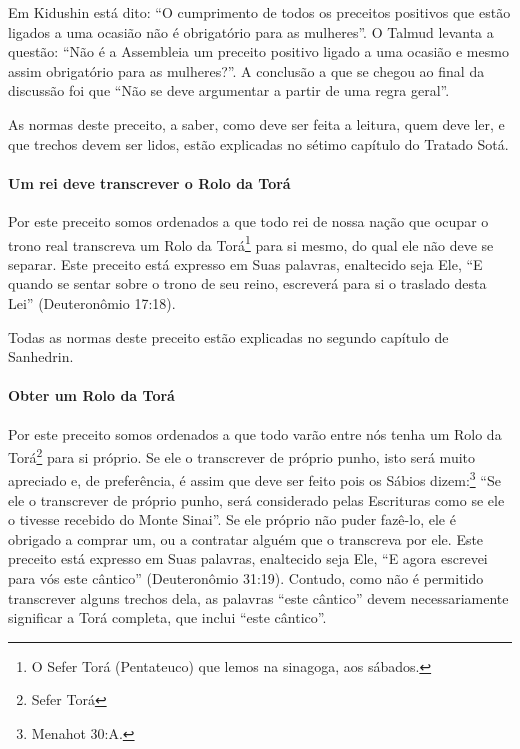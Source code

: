 Em Kidushin está dito: ``O cumprimento de todos os preceitos positivos
que estão ligados a uma ocasião não é obrigatório para as mulheres''. O
Talmud levanta a questão: ``Não é a Assembleia um preceito positivo
ligado a uma ocasião e mesmo assim obrigatório para as mulheres?''. A
conclusão a que se chegou ao final da discussão foi que ``Não se deve
argumentar a partir de uma regra geral''.

As normas deste preceito, a saber, como deve ser feita a leitura, quem
deve ler, e que trechos devem ser lidos, estão explicadas no sétimo
capítulo do Tratado Sotá.

\paragraph{Um rei deve transcrever o Rolo da Torá}

Por este preceito somos ordenados a que todo rei de nossa nação que
ocupar o trono real transcreva um Rolo da Torá\footnote{O Sefer Torá (Pentateuco) que lemos na sinagoga, aos sábados.}
para si mesmo, do qual ele não deve se separar. Este preceito está
expresso em Suas palavras, enaltecido seja Ele, ``E quando se sentar
sobre o trono de seu reino, escreverá para si o traslado desta Lei''
(Deuteronômio 17:18).

Todas as normas deste preceito estão explicadas no segundo capítulo de
Sanhedrin.

\paragraph{Obter um Rolo da Torá}

Por este preceito somos ordenados a que todo varão entre nós tenha um Rolo da Torá\footnote{Sefer Torá} para si próprio. Se ele o transcrever de próprio punho, isto será muito apreciado e, de preferência, é assim que deve ser feito
pois os Sábios dizem:\footnote{Menahot 30:A.} ``Se ele o transcrever de
próprio punho, será considerado pelas Escrituras como se ele o tivesse recebido do Monte Sinai''. Se ele
próprio não puder fazê-lo, ele é obrigado a comprar um, ou a contratar
alguém que o transcreva por ele. Este preceito está expresso em Suas palavras,
enaltecido seja Ele, ``E agora escrevei para vós este cântico''
(Deuteronômio 31:19). Contudo, como não é permitido transcrever alguns
trechos dela, as palavras ``este cântico'' devem necessariamente
significar a Torá completa, que inclui ``este cântico''.

